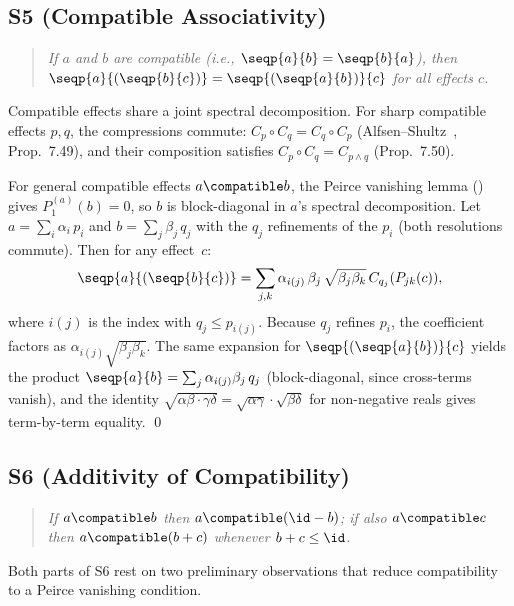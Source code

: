 \subsection*{S5 (Compatible Associativity)}

\begin{quote}
\emph{If $a$ and $b$ are compatible (i.e., $\seqp{a}{b} = \seqp{b}{a}$),
then $\seqp{a}{(\seqp{b}{c})} = \seqp{(\seqp{a}{b})}{c}$ for all effects $c$.}
\end{quote}

Compatible effects share a joint spectral decomposition.  For sharp
compatible effects $p, q$, the compressions commute: $C_p \circ C_q =
C_q \circ C_p$ (Alfsen--Shultz~\cite{AlfsenShultz2003}, Prop.~7.49),
and their composition satisfies $C_p \circ C_q = C_{p \wedge q}$
(Prop.~7.50).

For general compatible effects $a \compatible b$, the Peirce vanishing
lemma () gives $P_1^{(a)}(b) = 0$, so $b$ is
block-diagonal in $a$'s spectral decomposition.  Let
$a = \sum_i \alpha_i\, p_i$ and $b = \sum_j \beta_j\, q_j$ with the
$q_j$ refinements of the $p_i$ (both resolutions commute).  Then for
any effect~$c$:
\[
  \seqp{a}{(\seqp{b}{c})}
  = \sum_{j,k} \alpha_{i(j)}\,\beta_j\,
    \sqrt{\beta_j\beta_k}\, C_{q_j}(P_{jk}(c)),
\]
where $i(j)$ is the index with $q_j \le p_{i(j)}$.  Because $q_j$
refines $p_i$, the coefficient factors as
$\alpha_{i(j)}\sqrt{\beta_j\beta_k}$.  The same expansion for
$\seqp{(\seqp{a}{b})}{c}$ yields the product
$\seqp{a}{b} = \sum_j \alpha_{i(j)}\beta_j\, q_j$ (block-diagonal,
since cross-terms vanish), and the identity
$\sqrt{\alpha\beta \cdot \gamma\delta}
= \sqrt{\alpha\gamma}\cdot\sqrt{\beta\delta}$
for non-negative reals gives term-by-term equality. \qed

\subsection*{S6 (Additivity of Compatibility)}

\begin{quote}
\emph{If $a \compatible b$ then $a \compatible (\id - b)$; if
also $a \compatible c$ then $a \compatible (b + c)$ whenever
$b + c \le \id$.}
\end{quote}

Both parts of S6 rest on two preliminary observations that reduce
compatibility to a Peirce vanishing condition.

